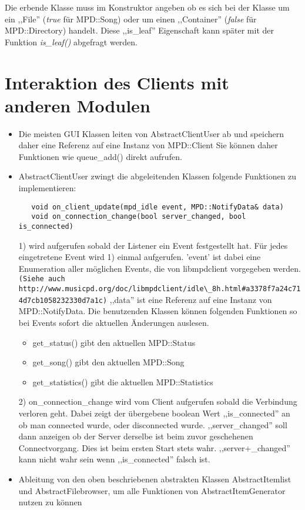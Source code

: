 Die erbende Klasse muss im Konstruktor angeben ob es sich bei der Klasse um ein ,,File'' (\emph{true} für MPD::Song) oder um einen ,,Container'' (\emph{false} für MPD::Directory) handelt.
Diese ,,is\_leaf'' Eigenschaft kann später mit der Funktion \emph{is\_leaf()} abgefragt werden.




\section{Interaktion des Clients mit anderen Modulen}
\begin{itemize}
\item Die meisten GUI Klassen leiten von AbstractClientUser ab und speichern daher eine Referenz auf eine Instanz von MPD::Client
        Sie können daher Funktionen wie queue\_add() direkt aufrufen.
\item AbstractClientUser zwingt die abgeleitenden Klassen folgende Funktionen zu implementieren: 
\begin{verbatim} 
   void on_client_update(mpd_idle event, MPD::NotifyData& data)
   void on_connection_change(bool server_changed, bool is_connected)
\end{verbatim}

1) wird aufgerufen sobald der Listener ein Event festgestellt hat. Für jedes eingetretene Event wird 1)
   einmal aufgerufen. 'event' ist dabei eine Enumeration aller möglichen Events, die von libmpdclient 
   vorgegeben werden. \verb+(Siehe auch http://www.musicpd.org/doc/libmpdclient/idle\_8h.html#a3378f7a24c714d7cb1058232330d7a1c)+
   ,,data'' ist eine Referenz auf eine Instanz von MPD::NotifyData. Die benutzenden Klassen können folgenden Funktionen so
   bei Events sofort die aktuellen Änderungen auslesen. 
   \begin{itemize} 
     \item get\_status() gibt den aktuellen MPD::Status
     \item get\_song() gibt den aktuellen MPD::Song
     \item get\_statistics() gibt die aktuellen MPD::Statistics
   \end{itemize} 

2) on\_connection\_change wird vom Client aufgerufen sobald die Verbindung verloren geht.
   Dabei zeigt der übergebene boolean Wert ,,is\_connected'' an ob man connected wurde, oder disconnected wurde.
   ,,server\_changed'' soll dann anzeigen ob der Server derselbe ist beim zuvor geschehenen Connectvorgang.
   Dies ist beim ersten Start stets wahr. ,,server+\_changed'' kann nicht wahr sein wenn ,,is\_connected'' falsch ist.
\item Ableitung von den oben beschriebenen abstrakten Klassen AbstractItemlist und AbstractFilebrowser, um alle Funktionen von AbstractItemGenerator nutzen zu können  
\end{itemize}